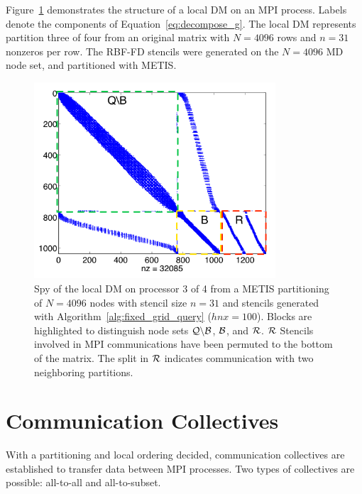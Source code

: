 \documentclass{report}
\begin{document}
Figure~\ref{fig:decomp_spy} demonstrates the structure of a local DM on an MPI process. Labels denote the components of Equation~\ref{eq:decompose_g}. The local DM represents partition three of four from an original matrix with $N=4096$ rows and $n=31$ nonzeros per row. The RBF-FD stencils were generated on the $N=4096$ MD node set, and partitioned with METIS. 
\begin{figure}
\begin{center}
\includegraphics[width=9cm]{rbffd_methods_content/decompositions/spy_metis_stencil_example_labels.png}
\caption{Spy of the local DM on processor 3 of 4 from a METIS partitioning of $N=4096$ nodes with stencil size $n=31$ and stencils generated with Algorithm~\ref{alg:fixed_grid_query} ($hnx=100$). Blocks are highlighted to distinguish node sets $\mathcal{Q} \backslash \mathcal{B}$, $\mathcal{B}$, and $\mathcal{R}$. $\mathcal{R}$ Stencils involved in MPI communications have been permuted to the bottom of the matrix. The split in $\mathcal{R}$ indicates communication with two neighboring partitions. }
\label{fig:decomp_spy}
\end{center}
\end{figure}




\section{Communication Collectives}
\label{sec:mpi_collectives}

With a partitioning and local ordering decided, communication collectives are established to transfer data between MPI processes. Two types of collectives are possible: all-to-all and all-to-subset. 
\end{document}
